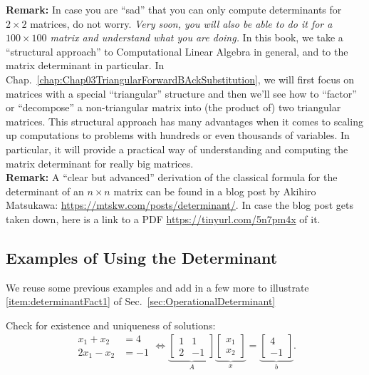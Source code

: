 \vspace*{.2cm}

\textbf{Remark:} In case you are ``sad'' that  you can only compute determinants for $2\times 2$ matrices, do not worry. \textit{Very soon, you will also be able to do it for a $100 \times 100$ matrix and understand what you are doing.} In this book, we take a ``structural approach'' to Computational Linear Algebra in general, and to the matrix determinant in particular. In Chap.~\ref{chap:Chap03TriangularForwardBAckSubstitution}, we will first focus on matrices with a special ``triangular'' structure and then we'll see how to ``factor'' or ``decompose'' a non-triangular matrix into (the product of) two triangular matrices. This structural approach has many advantages when it comes to scaling up computations to problems with hundreds or even thousands of variables. In particular, it will provide a practical way of understanding and computing the matrix determinant for really big matrices.\\

\textbf{Remark:} A ``clear but advanced'' derivation of the classical formula for the determinant of an $n \times n$ matrix can be found in a blog post by Akihiro Matsukawa: \url{https://mtskw.com/posts/determinant/}. In case the blog post gets taken down, here is a link to a PDF \url{https://tinyurl.com/5n7pm4x} of it. 

\subsection{Examples of Using the Determinant}

We reuse some previous examples and add in a few more to illustrate \ref{item:determinantFact1} of Sec.~\ref{sec:OperationalDeterminant}

\begin{example}
\label{ex:Det01}
Check for existence and uniqueness of solutions:
\begin{equation}
\label{eq:det01b}
\begin{aligned}
x_1+x_2 &=4 \\
2x_1-x_2&=-1
\end{aligned} \iff \underbrace{\left[\begin{array}{rr} 1 & 1\\
2 & -1 \end{array}\right]}_{A} \underbrace{\left[\begin{array}{c} x_1\\
x_2\end{array}\right]}_{x} =   \underbrace{\left[\begin{array}{r} 4\\
-1\end{array}\right]}_{b}.
\end{equation}
\end{example}

